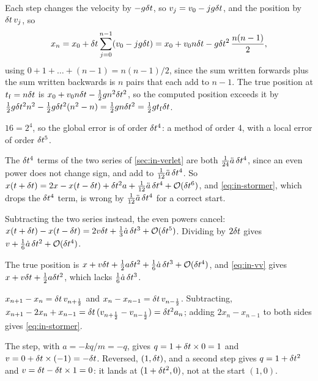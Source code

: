 \label{sec:in-solutions}

Each step changes the velocity by $-g\delta t$, so $v_j
= v_0 - jg\delta t$, and the position by $\delta t\,v_j$, so
\begin{equation*}
   x_n = x_0 + \delta t\sum_{j=0}^{n-1}(v_0 - jg\delta t)
   = x_0 + v_0n\delta t - g\delta t^2\,\frac{n(n - 1)}{2} ,
\end{equation*}
using $0 + 1 + \dots + (n - 1) = n(n - 1)/2$, since the sum written
forwards plus the sum written backwards is $n$ pairs that each add to $n
- 1$. The true position at $t_{\mathrm f} = n\delta t$ is $x_0 + v_0n\delta t -
\frac12 gn^2\delta t^2$, so the computed position exceeds it by $\frac12
g\delta t^2n^2 - \frac12 g\delta t^2(n^2 - n) = \frac12 gn\delta t^2 = \frac12
gt_{\mathrm f}\delta t$.

$16 = 2^4$, so the global error is of order
$\delta t^4$: a method of order 4, with a local error of order $\delta t^5$.

The $\delta t^4$ terms of the two series of
\cref{sec:in-verlet} are both $\frac1{24}\ddot{a}\,\delta t^4$, since an even
power does not change sign, and add to $\frac1{12}\ddot{a}\,\delta t^4$. So
$x(t + \delta t) = 2x - x(t - \delta t) + \delta t^2a + \frac1{12}\ddot{a}\,\delta t^4 +
\mathcal{O}(\delta t^6)$, and \cref{eq:in-stormer}, which drops the
$\delta t^4$ term, is wrong by $\frac1{12}\ddot{a}\,\delta t^4$ for a correct start.

Subtracting the two series instead, the even
powers cancel: $x(t + \delta t) - x(t - \delta t) = 2v\delta t + \frac13\dot{a}\,\delta t^3 +
\mathcal{O}(\delta t^5)$. Dividing by $2\delta t$ gives $v + \frac16\dot{a}\,\delta t^2 +
\mathcal{O}(\delta t^4)$.

The true position is $x + v\delta t + \frac12 a\delta t^2 +
\frac16\dot{a}\,\delta t^3 + \mathcal{O}(\delta t^4)$, and \cref{eq:in-vv} gives $x + v\delta t
+ \frac12 a\delta t^2$, which lacks $\frac16\dot{a}\,\delta t^3$.

$x_{n+1} - x_n = \delta t\,v_{n+\frac12}$ and $x_n -
x_{n-1} = \delta t\,v_{n-\frac12}$. Subtracting, $x_{n+1} - 2x_n + x_{n-1} =
\delta t\,(v_{n+\frac12} - v_{n-\frac12}) = \delta t^2a_n$; adding $2x_n - x_{n-1}$
to both sides gives \cref{eq:in-stormer}.

The step, with $a = -kq/m = -q$, gives $q
= 1 + \delta t\times0 = 1$ and $v = 0 + \delta t\times(-1) = -\delta t$. Reversed, $(1, \delta t)$, and a second step
gives $q = 1 + \delta t^2$ and $v = \delta t - \delta t\times1 = 0$: it lands at $(1 +
\delta t^2, 0)$, not at the start $(1, 0)$.

